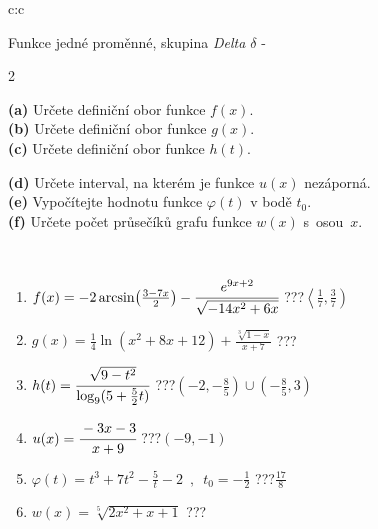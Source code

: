 \documentclass[10pt]{report}
\begin{document}
\begin{tabular}{c:c}
\begin{minipage}[c][104.5mm][t]{0.5\linewidth}
\begin{center}
\vspace{7mm}
{\huge Funkce jedné proměnné, skupina \textit{Delta $\delta$} -}\\[5mm]
\begin{minipage}{0.95\linewidth}
\begin{center}
{\small \begin{multicols}{2} \raggedright
\textbf{(a)} Určete definiční obor funkce \(f(x)\). \\[1mm]
\textbf{(b)} Určete definiční obor funkce \(g(x)\). \\[1mm]
\textbf{(c)} Určete definiční obor funkce \(h(t)\). \par \columnbreak
\textbf{(d)} Určete interval, na kterém je funkce \(u(x)\) nezáporná. \\[1mm]
\textbf{(e)} Vypočítejte hodnotu funkce \(\varphi(t)\) v bodě \(t_0\). \\[1mm]
\textbf{(f)} Určete počet průsečíků grafu funkce \(w(x)\) s~osou~\(x\). \\[1mm]
\end{multicols}
}
\end{center}
\end{minipage}
\\[4mm]
\begin{minipage}{0.79\linewidth}
\begin{center}
\begin{varwidth}{\linewidth}
\begin{enumerate}
\small
\item $f(x) = -2\arcsin\!\left( \frac{3-7x}{2} \right) - \cfrac{e^{9x+2}}{\sqrt{-14x^2+6x}}$\quad \dotfill\; ???\;\dotfill \quad $\left\langle\frac{1}{7} , \frac{3}{7}\right)$
\item $g(x) = \frac{1}{4} \ln{\!(x^2+8x+12)}+\frac{\sqrt[3]{1-x}}{x+7}$\quad \dotfill\; ???\;\dotfill {}
\item $h(t) = \cfrac{\sqrt{9-t^2}}{\log_9(5+\frac{5}{2}t)}$\quad \dotfill\; ???\;\dotfill \quad $\left(-2 , -\frac{8}{5}\right)\cup\left(-\frac{8}{5} , 3\right)$
\item $u(x) = \cfrac{-3x-3}{x+9}$\quad \dotfill\; ???\;\dotfill \quad $\left(-9 , -1\right)$
\item $\varphi(t) = t^3+7t^2-\frac{5}{t}-2 \enspace , \enspace t_0=-\frac{1}{2}$\quad \dotfill\; ???\;\dotfill \quad $\frac{17}{8}$
\item $w(x) = \sqrt[5]{2x^2+x+1}$\quad \dotfill\; ???\;\dotfill {}

\end{enumerate}
\end{varwidth}
\end{center}
\end{minipage}
\end{center}
\end{minipage}
\end{tabular}
\end{document}
